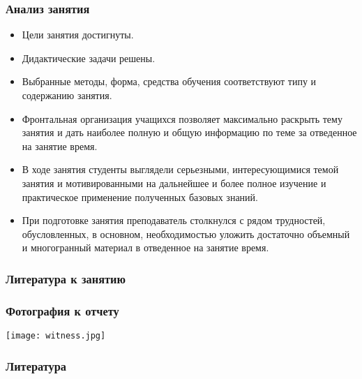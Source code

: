 \documentclass[compress, 9pt]{beamer}
\begin{document}
\begin{refsection}
\begin{frame}
    \end{frame}

    \begin{frame}\frametitle{Анализ занятия}

        \begin{itemize}\justifying
            \item Цели занятия достигнуты.
            \item Дидактические задачи решены.
            \item Выбранные методы, форма, средства обучения соответствуют типу и содержанию занятия.
            \item Фронтальная организация учащихся позволяет максимально раскрыть тему занятия и дать наиболее полную и общую информацию по теме за отведенное на занятие время.
            \item В ходе занятия студенты выглядели серьезными, интересующимися темой занятия и мотивированными на дальнейшее и более полное изучение и практическое применение полученных базовых знаний.
            \item При подготовке занятия преподаватель столкнулся с рядом трудностей, обусловленных, в основном, необходимостью уложить достаточно объемный и многогранный материал в отведенное на занятие время.
        \end{itemize}

    \end{frame}

    \begin{frame}\frametitle{Литература к занятию}
        \nocite{*}\printbibliography[heading=none, keyword={lesson2}]
    \end{frame}

    \end{refsection}

    \begin{frame}\frametitle{Фотография к отчету}
        \centering\texttt{[image: witness.jpg]}
    \end{frame}

    \begin{frame}\frametitle{Литература}
        \nocite{*}\printbibliography[keyword={main}]
    \end{frame}
\end{document}
